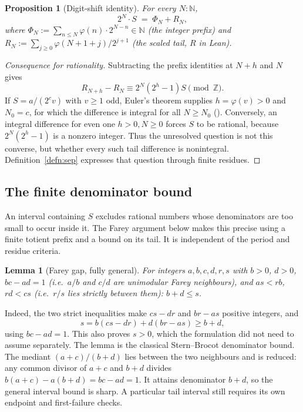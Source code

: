 \documentclass[11pt]{article}
\theoremstyle{plain}
\newtheorem{lem}[thm]{Lemma}
\newtheorem{prop}[thm]{Proposition}
\theoremstyle{definition}
\theoremstyle{remark}
\newcommand{\lean}[2]{\leanlink{#2}}
\newcommand{\Z}{\mathbb{Z}}
\begin{document}
\begin{prop}[Digit-shift identity]
\label{prop:shift}
For every $N : \mathbb{N}$,
\[
2^{N} \cdot S \;=\; \Phi_N + R_N,
\]
where $\Phi_N := \sum_{n \le N} \varphi(n) \cdot 2^{N-n} \in \mathbb{N}$ (the
integer prefix) and $R_N := \sum_{j \ge 0} \varphi(N+1+j)/2^{j+1}$ (the
scaled tail, \ensuremath{{R}} in Lean).
\end{prop}

\begin{proof}[Consequence for rationality]
Subtracting the prefix identities at $N+h$ and $N$ gives
\[
 R_{N+h}-R_N\equiv2^N(2^h-1)S\pmod\Z.
\]
If $S=a/(2^cv)$ with $v\ge1$ odd, Euler's theorem supplies
$h=\varphi(v)>0$ and $N_0=c$, for which the difference is integral for
all $N\ge N_0$
(\lean{eventual_period_of_not_irrational}{TotientTailPeriodKiller.lean:358}).
Conversely, an integral difference for even one $h>0,N\ge0$
forces $S$ to be rational, because $2^N(2^h-1)$ is a nonzero integer.
Thus the unresolved question is not this converse, but whether every such
tail difference is nonintegral. Definition~\ref{defn:sep} expresses that
question through finite residues.
\end{proof}

\subsection{The finite denominator bound}
\label{ssec:farey}

An interval containing $S$ excludes rational numbers whose
denominators are too small to occur inside it. The Farey argument
below makes this precise using a finite totient prefix and a bound
on its tail. It is independent of the period and residue criteria.

\begin{lem}[Farey gap, fully general]
\label{lem:farey}
For integers $a,b,c,d,r,s$ with $b>0$, $d>0$, $bc-ad=1$ (i.e.\ $a/b$ and
$c/d$ are unimodular Farey neighbours), and $as < rb$, $rd < cs$ (i.e.\ $r/s$
lies strictly between them): $b+d \le s$.
\end{lem}

Indeed, the two strict inequalities make $cs-dr$ and $br-as$ positive
integers, and
\[
 s=b(cs-dr)+d(br-as)\ge b+d,
\]
using $bc-ad=1$. This also proves $s>0$, which the formulation did not
need to assume separately. The lemma is the classical Stern--Brocot
denominator bound. The mediant $(a+c)/(b+d)$ lies between the two
neighbours and is reduced: any common divisor of $a+c$ and $b+d$
divides $b(a+c)-a(b+d)=bc-ad=1$. It attains denominator $b+d$,
so the general interval bound is sharp. A particular tail interval
still requires its own endpoint and first-failure checks.
\end{document}
